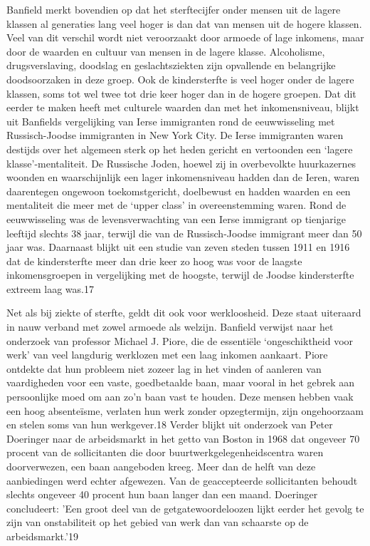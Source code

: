 \documentclass[
  a5paper,
  smalldemyvopaper,10pt,twoside,onecolumn,openright,extrafontsizes,hidelinks]{memoir}
\begin{document}
Banfield merkt bovendien op dat het sterftecijfer onder mensen uit de
lagere klassen al generaties lang veel hoger is dan dat van mensen uit
de hogere klassen. Veel van dit verschil wordt niet veroorzaakt door
armoede of lage inkomens, maar door de waarden en cultuur van mensen in
de lagere klasse. Alcoholisme, drugsverslaving, doodslag en
geslachtsziekten zijn opvallende en belangrijke doodsoorzaken in deze
groep. Ook de kindersterfte is veel hoger onder de lagere klassen, soms
tot wel twee tot drie keer hoger dan in de hogere groepen. Dat dit
eerder te maken heeft met culturele waarden dan met het inkomensniveau,
blijkt uit Banfields vergelijking van Ierse immigranten rond de
eeuwwisseling met Russisch-Joodse immigranten in New York City. De Ierse
immigranten waren destijds over het algemeen sterk op het heden gericht
en vertoonden een `lagere klasse'-mentaliteit. De Russische Joden,
hoewel zij in overbevolkte huurkazernes woonden en waarschijnlijk een
lager inkomensniveau hadden dan de Ieren, waren daarentegen ongewoon
toekomstgericht, doelbewust en hadden waarden en een mentaliteit die
meer met de `upper class' in overeenstemming waren. Rond de
eeuwwisseling was de levensverwachting van een Ierse immigrant op
tienjarige leeftijd slechts 38 jaar, terwijl die van de Russisch-Joodse
immigrant meer dan 50 jaar was. Daarnaast blijkt uit een studie van
zeven steden tussen 1911 en 1916 dat de kindersterfte meer dan drie keer
zo hoog was voor de laagste inkomensgroepen in vergelijking met de
hoogste, terwijl de Joodse kindersterfte extreem laag was.17

Net als bij ziekte of sterfte, geldt dit ook voor werkloosheid. Deze
staat uiteraard in nauw verband met zowel armoede als welzijn. Banfield
verwijst naar het onderzoek van professor Michael J. Piore, die de
essentiële `ongeschiktheid voor werk' van veel langdurig werklozen met
een laag inkomen aankaart. Piore ontdekte dat hun probleem niet zozeer
lag in het vinden of aanleren van vaardigheden voor een vaste,
goedbetaalde baan, maar vooral in het gebrek aan persoonlijke moed om
aan zo'n baan vast te houden. Deze mensen hebben vaak een hoog
absenteïsme, verlaten hun werk zonder opzegtermijn, zijn ongehoorzaam en
stelen soms van hun werkgever.18 Verder blijkt uit onderzoek van Peter
Doeringer naar de arbeidsmarkt in het getto van Boston in 1968 dat
ongeveer 70 procent van de sollicitanten die door
buurtwerkgelegenheidscentra waren doorverwezen, een baan aangeboden
kreeg. Meer dan de helft van deze aanbiedingen werd echter afgewezen.
Van de geaccepteerde sollicitanten behoudt slechts ongeveer 40 procent
hun baan langer dan een maand. Doeringer concludeert: 'Een groot deel
van de getgatewoordeloozen lijkt eerder het gevolg te zijn van
onstabiliteit op het gebied van werk dan van schaarste op de
arbeidsmarkt.'19
\end{document}
